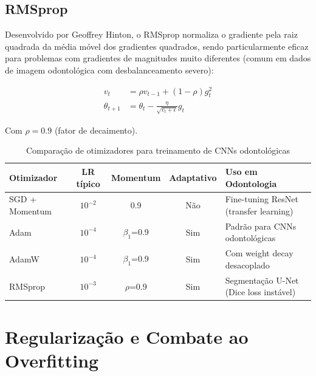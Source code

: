 \subsection{RMSprop}

Desenvolvido por Geoffrey Hinton, o RMSprop normaliza o gradiente pela raiz
quadrada da média móvel dos gradientes quadrados, sendo particularmente eficaz
para problemas com gradientes de magnitudes muito diferentes (comum em dados
de imagem odontológica com desbalanceamento severo):

\begin{align}
  v_t &= \rho v_{t-1} + (1 - \rho) g_t^2 \label{eq:rmsprop-v} \\
  \theta_{t+1} &= \theta_t - \frac{\eta}{\sqrt{v_t + \epsilon}} g_t \label{eq:rmsprop-update}
\end{align}

Com $\rho=0.9$ (fator de decaimento).

\begin{table}[H]
  \centering
  \caption{Comparação de otimizadores para treinamento de CNNs odontológicas}
  \label{tab:otimizadores}
  \begin{tabularx}{\textwidth}{lcccX}
    \toprule
    \textbf{Otimizador} & \textbf{LR típico} & \textbf{Momentum} & \textbf{Adaptativo} & \textbf{Uso em Odontologia} \\
    \midrule
    SGD + Momentum & $10^{-2}$ & 0.9 & Não & Fine-tuning ResNet (transfer learning) \\
    Adam & $10^{-4}$ & $\beta_1$=0.9 & Sim & Padrão para CNNs odontológicas \\
    AdamW & $10^{-4}$ & $\beta_1$=0.9 & Sim & Com weight decay desacoplado \\
    RMSprop & $10^{-3}$ & $\rho$=0.9 & Sim & Segmentação U-Net (Dice loss instável) \\
    \bottomrule
  \end{tabularx}
\end{table}


\section{Regularização e Combate ao Overfitting}
\label{sec:regularizacao}


